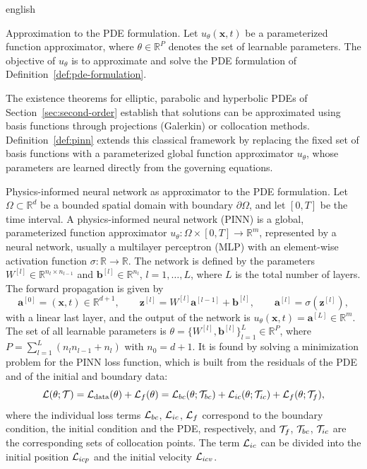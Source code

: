 \begin{hyphenrules}{english}
\begin{definicion}{Approximation to the PDE formulation.}\label{def:pde-approx}
Let $u_\theta(\mathbf{x},t)$ be a parameterized function approximator, where $\theta\in\mathbb{R}^P$ denotes the set of
learnable parameters. The objective of $u_\theta$ is to approximate and solve the PDE formulation of
Definition~\ref{def:pde-formulation}.
\end{definicion}

The existence theorems for elliptic, parabolic and hyperbolic PDEs of Section~\ref{sec:second-order} establish
that solutions can be approximated using basis functions through projections (Galerkin) or collocation
methods. Definition~\ref{def:pinn} extends this classical framework by replacing the fixed set of basis functions
with a parameterized global function approximator $u_\theta$, whose parameters are learned directly from
the governing equations.

\begin{definicion}{Physics-informed neural network as approximator to the PDE formulation.}\label{def:pinn}
Let $\Omega\subset\mathbb{R}^d$ be a bounded spatial domain with boundary $\partial\Omega$, and let $[0,T]$ be
the time interval. A physics-informed neural network (PINN) is a global, parameterized function
approximator $u_\theta:\Omega\times[0,T]\to\mathbb{R}^{m}$, represented by a neural network, usually a
multilayer perceptron (MLP) with an element-wise activation function $\sigma:\mathbb{R}\to\mathbb{R}$. The network is
defined by the parameters $W^{[l]}\in\mathbb{R}^{n_l\times n_{l-1}}$ and $\mathbf{b}^{[l]}\in\mathbb{R}^{n_l}$,
$l=1,\dots,L$, where $L$ is the total number of layers. The forward propagation is given by
\cite{goodfellow2016}
\[
  \mathbf{a}^{[0]}=(\mathbf{x},t)\in\mathbb{R}^{d+1},\qquad
  \mathbf{z}^{[l]}=W^{[l]}\mathbf{a}^{[l-1]}+\mathbf{b}^{[l]},\qquad
  \mathbf{a}^{[l]}=\sigma(\mathbf{z}^{[l]}),
\]
with a linear last layer, and the output of the network is $u_\theta(\mathbf{x},t)=\mathbf{a}^{[L]}\in\mathbb{R}^m$. The
set of all learnable parameters is $\theta=\{W^{[l]},\mathbf{b}^{[l]}\}_{l=1}^{L}\in\mathbb{R}^{P}$, where
$P=\sum_{l=1}^{L}(n_ln_{l-1}+n_l)$ with $n_0=d+1$. It is found by solving a minimization problem for the
PINN loss function, which is built from the residuals of the PDE and of the initial and boundary data:
\[
  \mathcal{L}(\theta;\mathcal{T})=\mathcal{L}_{\mathrm{data}}(\theta)+\mathcal{L}_f(\theta)
  =\mathcal{L}_{bc}(\theta;\mathcal{T}_{bc})+\mathcal{L}_{ic}(\theta;\mathcal{T}_{ic})+\mathcal{L}_f(\theta;\mathcal{T}_f),
\]
where the individual loss terms $\mathcal{L}_{bc}$, $\mathcal{L}_{ic}$, $\mathcal{L}_f$ correspond to the boundary
condition, the initial condition and the PDE, respectively, and $\mathcal{T}_f$, $\mathcal{T}_{bc}$, $\mathcal{T}_{ic}$ are the
corresponding sets of collocation points. The term $\mathcal{L}_{ic}$ can be divided into the initial
position $\mathcal{L}_{icp}$ and the initial velocity $\mathcal{L}_{icv}$.
\end{definicion}


\end{hyphenrules}
